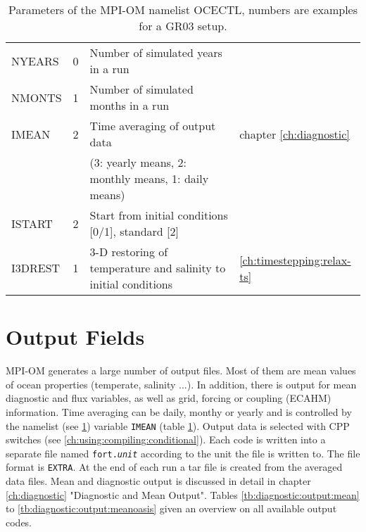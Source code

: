 \begin{table}
\begin{footnotesize}
\begin{tabular}{l|c|p{8cm}|p{2cm}}
NYEARS    &  0	     &   Number of simulated years in a run 		                &   \\
NMONTS    &  1	     &   Number of simulated months in a run 		                &   \\ \hline
IMEAN	  &  2	     &   Time averaging of output data                                  &  chapter \ref{ch:diagnostic} \\
          &          &  (3: yearly means, 2: monthly means, 1: daily means)        	                &   \\
ISTART    &  2	     &  Start from initial conditions [0/1], standard [2]               &   \\
I3DREST   &  1	     &  3-D restoring of temperature and salinity to initial conditions &  \ref{ch:timestepping:relax-ts}\\

\end{tabular}
\end{footnotesize}
\caption{Parameters of the MPI-OM namelist OCECTL, numbers are examples for a GR03 setup.}
\label{tb:using:namelist}
\end{table}



\section{Output Fields}
\label{sec:using:output}


MPI-OM generates a large number of output files. Most of them are mean values of ocean properties (temperate, salinity ...). 
In addition, there is output for mean diagnostic and flux variables, as well as grid, forcing or coupling (ECAHM) information.
Time averaging can be daily, monthy or yearly and is controlled by the namelist (see \ref{tb:using:namelist}) 
variable \texttt{IMEAN} (table \ref{tb:using:namelist}).
Output data is selected with CPP switches (see \ref{ch:using:compiling:conditional}).
Each code is written into a separate file named \texttt{fort.}\textit{\texttt{unit}} according to the unit the file is written to. 
The file format is \texttt{EXTRA}. At the end of each run a tar file is created from the averaged data files.
Mean and diagnostic output is discussed in detail in chapter \ref{ch:diagnostic} "Diagnostic and Mean Output".
Tables \ref{tb:diagnostic:output:mean} to \ref{tb:diagnostic:output:meanoasis} given an overview on all available output codes.

